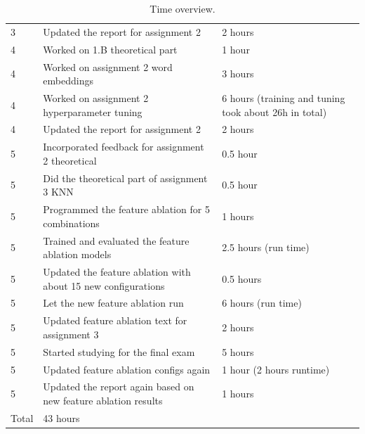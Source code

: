 \documentclass[11pt]{article}
\begin{document}
\begin{table}[!htb]
{\begin{tabular}{lll}
            3     & Updated the report for assignment 2                            & 2 hours                                               \\
            4     & Worked on 1.B theoretical part                                 & 1 hour                                                \\
            4     & Worked on assignment 2 word embeddings                         & 3 hours                                               \\
            4     & Worked on assignment 2 hyperparameter tuning                   & 6 hours (training and tuning took about 26h in total) \\
            4     & Updated the report for assignment 2                            & 2 hours                                               \\
            5     & Incorporated feedback for assignment 2 theoretical             & 0.5 hour                                              \\
            5     & Did the theoretical part of assignment 3 KNN                   & 0.5 hour                                              \\
            5     & Programmed the feature ablation for 5 combinations             & 1 hours                                               \\
            5     & Trained and evaluated the feature ablation models              & 2.5 hours (run time)                                  \\
            5     & Updated the feature ablation with about 15 new configurations  & 0.5 hours                                             \\
            5     & Let the new feature ablation run                               & 6 hours (run time)                                    \\
            5     & Updated feature ablation text for assignment 3                 & 2 hours                                               \\
            5     & Started studying for the final exam                            & 5 hours                                               \\
            5     & Updated feature ablation configs again                         & 1 hour (2 hours runtime)                              \\
            5     & Updated the report again based on new feature ablation results & 1 hours                                               \\
            \midrule
            Total & 43 hours                                                                                                               \\

            \bottomrule
        \end{tabular}
        \caption{Time overview. \label{time} }}
\end{table}
\end{document}
